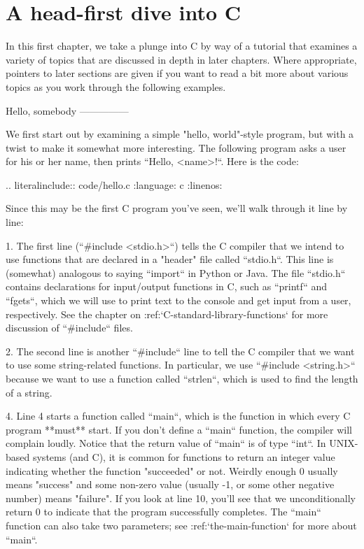 \chapter{A head-first dive into C}

In this first chapter, we take a plunge into C by way of a tutorial that examines a variety of topics that are discussed in depth in later chapters.  Where appropriate, pointers to later sections are given if you want to read a bit more about various topics as you work through the following examples.

Hello, somebody
---------------

We first start out by examining a simple "hello, world"-style program, but with a twist to make it somewhat more interesting.  The following program asks a user for his or her name, then prints ``Hello, <name>!``.  Here is the code:

.. literalinclude:: code/hello.c
   :language: c
   :linenos:

Since this may be the first C program you've seen, we'll walk through it line by line:

  1.  The first line (``#include <stdio.h>``) tells the C compiler that we intend to use functions that are declared in a "header" file called ``stdio.h``.  This line is (somewhat) analogous to saying ``import`` in Python or Java.  The file ``stdio.h`` contains declarations for input/output functions in C, such as ``printf`` and ``fgets``, which we will use to print text to the console and get input from a user, respectively.  See the chapter on :ref:`C-standard-library-functions` for more discussion of ``#include`` files.

  2.  The second line is another ``#include`` line to tell the C compiler that we want to use some string-related functions.  In particular, we use ``#include <string.h>`` because we want to use a function called ``strlen``, which is used to find the length of a string.

  4.  Line 4 starts a function called ``main``, which is the function in which every C program **must** start.  If you don't define a ``main`` function, the compiler will complain loudly.  Notice that the return value of ``main`` is of type ``int``.  In UNIX-based systems (and C), it is common for functions to return an integer value indicating whether the function "succeeded" or not.  Weirdly enough 0 usually means "success" and some non-zero value (usually -1, or some other negative number) means "failure".  If you look at line 10, you'll see that we unconditionally return 0 to indicate that the program successfully completes.  The ``main`` function can also take two parameters; see :ref:`the-main-function` for more about ``main``.

